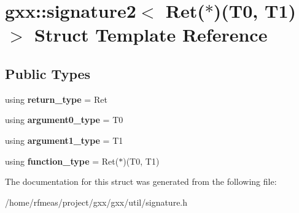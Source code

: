 \hypertarget{structgxx_1_1signature2_3_01Ret_07_5_08_07T0_00_01T1_08_4}{}\section{gxx\+:\+:signature2$<$ Ret($\ast$)(T0, T1)$>$ Struct Template Reference}
\label{structgxx_1_1signature2_3_01Ret_07_5_08_07T0_00_01T1_08_4}
\subsection*{Public Types}
\begin{DoxyCompactItemize}
\item 
using {\bfseries return\+\_\+type} = Ret\hypertarget{structgxx_1_1signature2_3_01Ret_07_5_08_07T0_00_01T1_08_4_a2f98913b8028c66882a18621fb9178ee}{}\label{structgxx_1_1signature2_3_01Ret_07_5_08_07T0_00_01T1_08_4_a2f98913b8028c66882a18621fb9178ee}

\item 
using {\bfseries argument0\+\_\+type} = T0\hypertarget{structgxx_1_1signature2_3_01Ret_07_5_08_07T0_00_01T1_08_4_acf4512016a4a6cb94d8086676ea2292a}{}\label{structgxx_1_1signature2_3_01Ret_07_5_08_07T0_00_01T1_08_4_acf4512016a4a6cb94d8086676ea2292a}

\item 
using {\bfseries argument1\+\_\+type} = T1\hypertarget{structgxx_1_1signature2_3_01Ret_07_5_08_07T0_00_01T1_08_4_a8e229c0cddb73da3f89622a82db6475c}{}\label{structgxx_1_1signature2_3_01Ret_07_5_08_07T0_00_01T1_08_4_a8e229c0cddb73da3f89622a82db6475c}

\item 
using {\bfseries function\+\_\+type} = Ret($\ast$)(T0, T1)\hypertarget{structgxx_1_1signature2_3_01Ret_07_5_08_07T0_00_01T1_08_4_a5de7d8f6e58d5e10dd35ea8023675c39}{}\label{structgxx_1_1signature2_3_01Ret_07_5_08_07T0_00_01T1_08_4_a5de7d8f6e58d5e10dd35ea8023675c39}

\end{DoxyCompactItemize}


The documentation for this struct was generated from the following file\+:\begin{DoxyCompactItemize}
\item 
/home/rfmeas/project/gxx/gxx/util/signature.\+h\end{DoxyCompactItemize}
